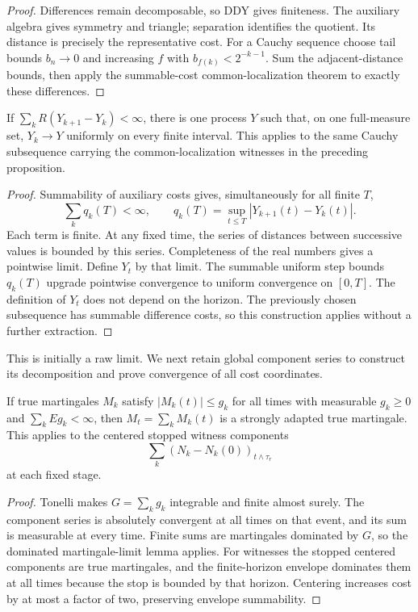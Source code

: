 \begin{proof}
Differences remain decomposable, so DDY gives finiteness. The auxiliary
algebra gives symmetry and triangle; separation identifies the quotient.
Its distance is precisely the representative cost.
For a Cauchy sequence choose tail bounds $b_n\to0$ and increasing $f$ with
$b_{f(k)}<2^{-k-1}$. Sum the adjacent-distance bounds, then apply the
summable-cost common-localization theorem to exactly these differences.
\end{proof}
\begin{lemma}
If $\sum_kR(Y_{k+1}-Y_k)<\infty$, there is one process $Y$ such that,
on one full-measure set, $Y_k\to Y$ uniformly on every finite interval.
This applies to the same Cauchy subsequence carrying the common-localization
witnesses in the preceding proposition.
\end{lemma}
\begin{proof}
Summability of auxiliary costs gives, simultaneously for all finite $T$,
\[
 \sum_kq_k(T)<\infty,\qquad
 q_k(T)=\sup_{t\leq T}|Y_{k+1}(t)-Y_k(t)|.
\]
Each term is finite. At any fixed time, the series of distances between
successive values is bounded by this series. Completeness of the real
numbers gives a pointwise limit. Define $Y_t$ by that limit.
The summable uniform step bounds $q_k(T)$ upgrade pointwise convergence to
uniform convergence on $[0,T]$. The definition of $Y_t$ does not depend
on the horizon. The previously chosen subsequence has summable difference
costs, so this construction applies without a further extraction.
\end{proof}
This is initially a raw limit. We next retain global component series to
construct its decomposition and prove convergence of all cost coordinates.
\begin{lemma}
If true martingales $M_k$ satisfy $|M_k(t)|\leq g_k$ for all times with
measurable $g_k\geq0$ and $\sum_kEg_k<\infty$, then $M_t=\sum_kM_k(t)$
is a strongly adapted true martingale. This applies to the centered stopped
witness components
\[
 \sum_k(N_k-N_k(0))_{t\wedge\tau_r}
\]
 at each fixed stage.
\end{lemma}
\begin{proof}
Tonelli makes $G=\sum_kg_k$ integrable and finite almost surely.
The component series is absolutely convergent at all times on that event,
and its sum is measurable at every time. Finite sums are martingales dominated
by $G$, so the dominated martingale-limit lemma applies.
For witnesses the stopped centered components are true martingales, and the
finite-horizon envelope dominates them at all times because the stop is
bounded by that horizon. Centering increases cost by at most a factor of two,
preserving envelope summability.
\end{proof}
